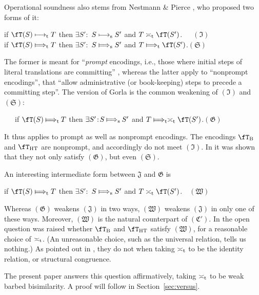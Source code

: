 \documentclass[runningheads]{llncs}
\newcommand{\sect}[1]{Section~\ref{sec:#1}}
\newcommand{\pT}{T}                      %
\newcommand{\trans}[1]{\fT(#1)}
\begin{document}
Operational soundness also stems from Nestmann \& Pierce \cite{NestmannP00}, who proposed two forms of it:
\begin{center}
\mbox{}\hfill
if $\trans{S} \longmapsto_{\rm t} \pT$ then $\exists S'\!:$ $S\longmapsto_{\rm s} S'$ and $\pT\asymp_{\rm t} \trans{S'}$.~~~\hfill$(\mathfrak{I})$\\
\mbox{}\hfill
if $\trans{S} \Longmapsto_{\rm t} \pT$ then $\exists S'\!:$ $S\Longmapsto_{\rm s} S'$ and $\pT\Longmapsto_{\rm t}\trans{S'}$.\hfill$(\mathfrak{S})$
\end{center}
The former is meant for ``\emph{prompt} encodings, i.e., those where initial steps of literal
translations are committing'' \cite{NestmannP00}, whereas the latter apply to ``nonprompt encodings'',
that ``allow administrative (or book-keeping) steps to precede a committing step''.
The version of Gorla is the common weakening of $(\mathfrak{I})$ and $(\mathfrak{S})$:
\begin{center}
\mbox{~~\,}\hfill
if $\trans{S} \mathbin{\Longmapsto_{\rm t}} \pT$ then $\exists S'\!:\!S\mathbin{\Longmapsto_{\rm s}} S'$ and $\pT\Longmapsto_{\rm t}\asymp_{\rm t}\trans{S'}$.\hfill$(\mathfrak{G})$
\end{center}
It thus applies to prompt as well as nonprompt encodings.
The encodings $\fT_{\rm B}$ and $\fT_{\rm HT}$ are nonprompt, and accordingly do not meet $(\mathfrak{I})$.
In \cite{vG18a} it was shown that they not only satisfy $(\mathfrak{G})$, but even $(\mathfrak{S})$.

An interesting intermediate form between $\mathfrak{J}$ and $\mathfrak{G}$ is
\begin{center}
\mbox{}\hfill
if $\trans{S} \Longmapsto_{\rm t} \pT$ then $\exists S'\!:$ $S\Longmapsto_{\rm s} S'$ and $\pT\asymp_{\rm t} \trans{S'}$.\hfill~~$(\mathfrak{W})$
\end{center}
Whereas $(\mathfrak{G})$ weakens $(\mathfrak{J})$ in two ways, $(\mathfrak{W})$ weakens
$(\mathfrak{J})$ in only one of these ways.
Moreover, $(\mathfrak{W})$ is the natural counterpart of $(\mathfrak{C}')$.
In \cite{vG18a} the open question was raised whether $\fT_{\rm B}$ and $\fT_{\rm HT}$ satisfy
$(\mathfrak{W})$, for a reasonable choice of $\asymp_{\rm t}$.
(An unreasonable choice, such as the universal relation, tells us nothing.)
As pointed out in \cite{vG18a}, they do not when taking $\asymp_{\rm t}$ to be the identity relation, or
structural congruence.

The present paper answers this question affirmatively, taking  $\asymp_{\rm t}$
to be weak barbed bisimilarity. A proof will follow in \sect{versus}.
\end{document}

